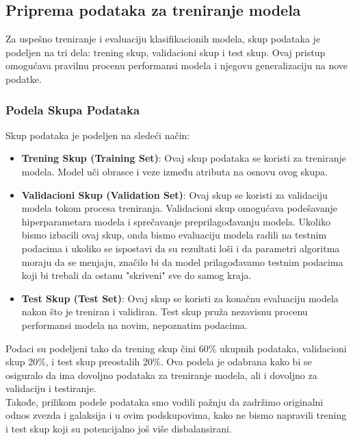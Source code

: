 \documentclass[a4paper,12pt]{article}
\begin{document}
\subsection{Priprema podataka za treniranje modela}
Za uspešno treniranje i evaluaciju klasifikacionih modela, skup podataka je podeljen na tri dela: trening skup, validacioni skup i test skup. Ovaj pristup omogućava pravilnu procenu performansi modela i njegovu generalizaciju na nove podatke.

\subsubsection{Podela Skupa Podataka}
Skup podataka je podeljen na sledeći način:
\begin{itemize}
    \item \textbf{Trening Skup (Training Set)}: Ovaj skup podataka se koristi za treniranje modela. Model uči obrasce i veze između atributa na osnovu ovog skupa.
    \item \textbf{Validacioni Skup (Validation Set)}: Ovaj skup se koristi za validaciju modela tokom procesa treniranja. Validacioni skup omogućava podešavanje hiperparametara modela i sprečavanje preprilagođavanju modela. Ukoliko bismo izbacili ovaj skup, onda bismo evaluaciju modela radili na testnim podacima i ukoliko se ispostavi da su rezultati loši i da parametri algoritma moraju da se menjaju, značilo bi da model prilagođavamo testnim podacima koji bi trebali da ostanu "skriveni" sve do samog kraja.
    \item \textbf{Test Skup (Test Set)}: Ovaj skup se koristi za konačnu evaluaciju modela nakon što je treniran i validiran. Test skup pruža nezavisnu procenu performansi modela na novim, nepoznatim podacima.
\end{itemize}

Podaci su podeljeni tako da trening skup čini 60\% ukupnih podataka, validacioni skup 20\%, i test skup preostalih 20\%. Ova podela je odabrana kako bi se osiguralo da ima dovoljno podataka za treniranje modela, ali i dovoljno za validaciju i testiranje.\\
Takođe, prilikom podele podataka smo vodili pažnju da zadržimo originalni odnos zvezda i galaksija i u ovim podskupovima, kako ne bismo napravili trening i test skup koji su potencijalno još više disbalansirani.
\end{document}
